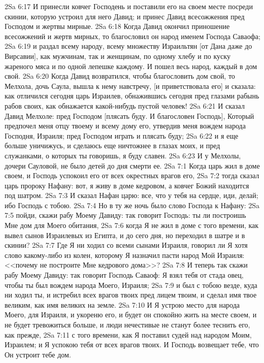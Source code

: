 \vs 2Sa 6:17 И принесли ковчег Господень и поставили его на своем месте посреди скинии, которую устроил для него Давид; и принес Давид всесожжения пред Господом и жертвы мирные.
\vs 2Sa 6:18 Когда Давид окончил приношение всесожжений и жертв мирных, то благословил он народ именем Господа Саваофа;
\vs 2Sa 6:19 и раздал всему народу, всему множеству Израильтян [от Дана даже до Вирсавии], как мужчинам, так и женщинам, по одному хлебу и по куску жареного мяса и по одной лепешке каждому. И пошел весь народ, каждый в дом свой.
\vs 2Sa 6:20 Когда Давид возвратился, чтобы благословить дом свой, то Мелхола, дочь Саула, вышла к нему навстречу, [и приветствовала его] и сказала: как отличился сегодня царь Израилев, обнажившись сегодня пред глазами рабынь рабов своих, как обнажается какой-нибудь пустой человек!
\vs 2Sa 6:21 И сказал Давид Мелхоле: пред Господом [плясать буду. И благословен Господь], Который предпочел меня отцу твоему и всему дому его, утвердив меня вождем народа Господня, Израиля; пред Господом играть и плясать буду;
\vs 2Sa 6:22 и я еще больше уничижусь, и сделаюсь еще ничтожнее в глазах моих, и пред служанками, о которых ты говоришь, я буду славен.
\vs 2Sa 6:23 И у Мелхолы, дочери Сауловой, не было детей до дня смерти ее.
\vs 2Sa 7:1 Когда царь жил в доме своем, и Господь успокоил его от всех окрестных врагов его,
\vs 2Sa 7:2 тогда сказал царь пророку Нафану: вот, я живу в доме кедровом, а ковчег Божий находится под шатром.
\vs 2Sa 7:3 И сказал Нафан царю: все, что у тебя на сердце, иди, делай; ибо Господь с тобою.
\vs 2Sa 7:4 Но в ту же ночь было слово Господа к Нафану:
\vs 2Sa 7:5 пойди, скажи рабу Моему Давиду: так говорит Господь: ты ли построишь Мне дом для Моего обитания,
\vs 2Sa 7:6 когда Я не жил в доме с того времени, как вывел сынов Израилевых из Египта, и до сего дня, но переходил в шатре и в скинии?
\vs 2Sa 7:7 Где Я ни ходил со всеми сынами Израиля, говорил ли Я хотя слово какому-либо из колен, которому Я назначил пасти народ Мой Израиля: <<почему не построите Мне кедрового дома>>?
\vs 2Sa 7:8 И теперь так скажи рабу Моему Давиду: так говорит Господь Саваоф: Я взял тебя от стада овец, чтобы ты был вождем народа Моего, Израиля;
\vs 2Sa 7:9 и был с тобою везде, куда ни ходил ты, и истребил всех врагов твоих пред лицем твоим, и сделал имя твое великим, как имя великих на земле.
\vs 2Sa 7:10 И Я устрою место для народа Моего, для Израиля, и укореню его, и будет он спокойно жить на месте своем, и не будет тревожиться больше, и люди нечестивые не станут более теснить его, как прежде,
\vs 2Sa 7:11 с того времени, как Я поставил судей над народом Моим, Израилем; и Я успокою тебя от всех врагов твоих. И Господь возвещает тебе, что Он устроит тебе дом.
